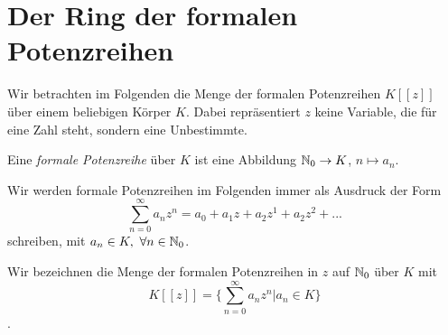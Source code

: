 \section{Der Ring der formalen Potenzreihen}\label{potenzreihenring}

%
Wir betrachten im Folgenden die Menge der formalen Potenzreihen $K[[z]]$ über einem beliebigen Körper $K$. Dabei repräsentiert $z$ keine Variable, die für eine Zahl steht, sondern eine Unbestimmte.  
\begin{defn}
Eine \textit{formale Potenzreihe} über $K$ ist eine Abbildung $\mathbb{N}_0 \rightarrow K$, $n \mapsto a_n$.
\end{defn}
\begin{bem}
Wir werden formale Potenzreihen im Folgenden immer als Ausdruck der Form
\begin{equation}\label{eq: formalepotenzreihe}
\sum_{n=0}^\infty a_n z^n = a_0 + a_1z + a_2z^1 + a_2z^2 + ...
\end{equation}
schreiben, mit $a_n \in K,~ \forall n \in \mathbb{N}_0$.
\end{bem}

Wir bezeichnen die Menge der formalen Potenzreihen in $z$ auf $\mathbb{N}_0$ über $K$ mit \[K [[z]] = \lbrace \sum_{n=0}^\infty a_n z^n \vert a_n\in K \rbrace \]. 

